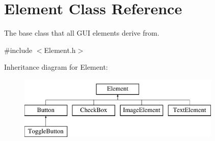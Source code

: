 \hypertarget{class_element}{\section{Element Class Reference}
\label{class_element}
}


The base class that all G\-U\-I elements derive from.  




{\ttfamily \#include $<$Element.\-h$>$}

Inheritance diagram for Element\-:\begin{figure}[H]
\begin{center}
\leavevmode
\includegraphics[height=3.000000cm]{class_element}
\end{center}
\end{figure}
